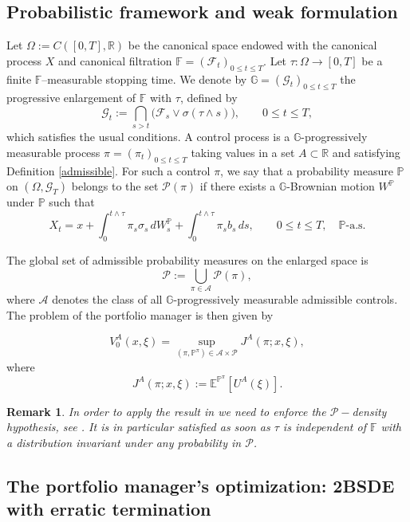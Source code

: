 \documentclass[11pt,a4paper]{article}
\theoremstyle{thmstyleone}%
\theoremstyle{thmstyletwo}%
\newtheorem{remark}{Remark}%
\theoremstyle{thmstylethree}%
\begin{document}
\subsection{Probabilistic framework and weak formulation}


Let $\Omega := C([0,T],\mathbb{R})$ be the canonical space endowed with the 
canonical process $X$ and canonical filtration 
$\mathbb{F}=(\mathcal{F}_t)_{0\le t\le T}$.
Let $\tau:\Omega\to[0,T]$ be a finite $\mathbb{F}$--measurable stopping time.  
We denote by $\mathbb{G}=(\mathcal{G}_t)_{0\le t\le T}$ the progressive enlargement 
of $\mathbb{F}$ with $\tau$, defined by
\[
\mathcal{G}_t := \bigcap_{s>t} 
\big( \mathcal{F}_s \vee \sigma(\tau\wedge s) \big),
\qquad 0\le t\le T,
\]
which satisfies the usual conditions. A control process is a $\mathbb{G}$-progressively measurable process 
$\pi=(\pi_t)_{0\le t\le T}$ taking values in a set $A\subset\mathbb{R}$ and satisfying Definition \ref{admissible}. For such a control $\pi$, we say that a probability measure $\mathbb{P}$ on 
$(\Omega,\mathcal{G}_T)$ belongs to the set $\mathcal{P}(\pi)$ if there exists a 
$\mathbb{G}$-Brownian motion $W^{\mathbb{P}}$ under $\mathbb{P}$ such that
\[
X_t
=
x + \int_0^{t\wedge\tau} \pi_s \sigma_s\, dW_s^{\mathbb{P}}
  + \int_0^{t\wedge\tau} \pi_s b_s\, ds,
\qquad 0\le t\le T,\quad \mathbb{P}\text{-a.s.}
\]

The global set of admissible probability measures on the enlarged space is
\[
\mathcal{P}
   := \bigcup_{\pi\in\mathcal{A}} \mathcal{P}(\pi),
\]
where $\mathcal{A}$ denotes the class of all $\mathbb{G}$-progressively measurable admissible controls.  The problem of the portfolio manager is then given by 

\begin{equation}\label{pbAgent:rigor}  \tag{A} V^A_0(x,\xi)=\sup_{(\pi,\mathbb P^\pi)\in \mathcal A\times \mathcal P} J^A(\pi;x,\xi),\end{equation}
where
\[J^A(\pi;x,\xi):=\mathbb E^{\mathbb P^\pi}[ U^A(\xi)].\]
\begin{remark}
    In order to apply the result in \cite{gennaro20252bsde} we need to enforce the $\mathcal P-$density hypothesis, see \cite[Hypothesis 2.4 ($\mathcal P_0$-Density Hypothesis)]{gennaro20252bsde}. It is in particular satisfied as soon as $\tau$ is independent of $\mathbb F$ with a distribution invariant under any probability in $\mathcal P$.
\end{remark}


\subsection{The portfolio manager's optimization: 2BSDE with erratic termination}
\end{document}
